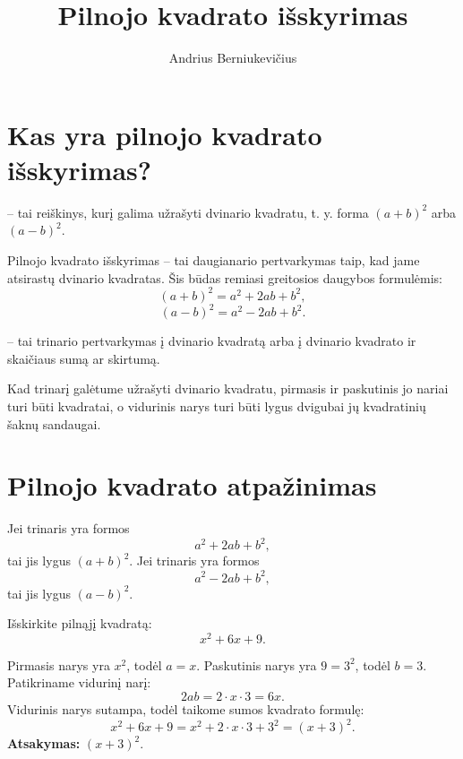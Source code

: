 \documentclass[11pt,a4paper]{scrartcl}
\title{Pilnojo kvadrato išskyrimas}
\author{Andrius Berniukevičius}
\begin{document}
\maketitle

\section{Kas yra pilnojo kvadrato išskyrimas?}
\begin{definition}
 -- tai reiškinys, kurį galima užrašyti dvinario kvadratu, t. y. forma $(a+b)^2$ arba $(a-b)^2$.
\end{definition}

Pilnojo kvadrato išskyrimas -- tai daugianario pertvarkymas taip, kad jame atsirastų dvinario kvadratas. Šis būdas remiasi greitosios daugybos formulėmis:
\[
(a+b)^2=a^2+2ab+b^2,
\]
\[
(a-b)^2=a^2-2ab+b^2.
\]



\begin{definition}
 -- tai trinario pertvarkymas į dvinario kvadratą arba į dvinario kvadrato ir skaičiaus sumą ar skirtumą.
\end{definition}

Kad trinarį galėtume užrašyti dvinario kvadratu, pirmasis ir paskutinis jo nariai turi būti kvadratai, o vidurinis narys turi būti lygus dvigubai jų kvadratinių šaknų sandaugai.

\section{Pilnojo kvadrato atpažinimas}

\begin{property}
Jei trinaris yra formos
\[
a^2+2ab+b^2,
\]
tai jis lygus $(a+b)^2$. Jei trinaris yra formos
\[
a^2-2ab+b^2,
\]
tai jis lygus $(a-b)^2$.
\end{property}

\setcounter{theorem}{0}

\begin{example}
Išskirkite pilnąjį kvadratą:
\[
x^2+6x+9.
\]
\end{example}
\begin{solution}
Pirmasis narys yra $x^2$, todėl $a=x$. Paskutinis narys yra $9=3^2$, todėl $b=3$. Patikriname vidurinį narį:
\[
2ab=2\cdot x\cdot3=6x.
\]
Vidurinis narys sutampa, todėl taikome sumos kvadrato formulę:
\[
x^2+6x+9=x^2+2\cdot x\cdot3+3^2=(x+3)^2.
\]
\textbf{Atsakymas:} $(x+3)^2$.
\end{solution}
\end{document}

